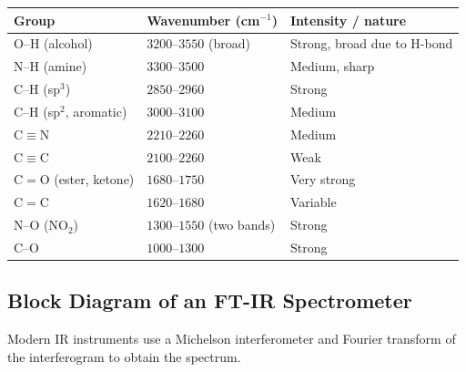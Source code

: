 \documentclass[12pt,a4paper]{article}
\begin{document}
\begin{tabularx}{\linewidth}{|B{3.4cm}|Y|Y|}
\hline
\textbf{Group} & \textbf{Wavenumber (cm$^{-1}$)} & \textbf{Intensity / nature} \\
\hline
O--H (alcohol) & $3200$--$3550$ (broad) & Strong, broad due to H-bond \\
\hline
N--H (amine) & $3300$--$3500$ & Medium, sharp \\
\hline
C--H (sp$^{3}$) & $2850$--$2960$ & Strong \\
\hline
C--H (sp$^{2}$, aromatic) & $3000$--$3100$ & Medium \\
\hline
C${\equiv}$N & $2210$--$2260$ & Medium \\
\hline
C${\equiv}$C & $2100$--$2260$ & Weak \\
\hline
C${=}$O (ester, ketone) & $1680$--$1750$ & Very strong \\
\hline
C${=}$C & $1620$--$1680$ & Variable \\
\hline
N--O (NO$_2$) & $1300$--$1550$ (two bands) & Strong \\
\hline
C--O & $1000$--$1300$ & Strong \\
\hline
\end{tabularx}

\subsection{Block Diagram of an FT-IR Spectrometer}
Modern IR instruments use a Michelson interferometer and Fourier transform of the interferogram to obtain the spectrum.

\begin{tcolorbox}[tikzbox, title={Block Diagram of an FT-IR Spectrometer}]
\centering
{}
\end{tcolorbox}
\end{document}
